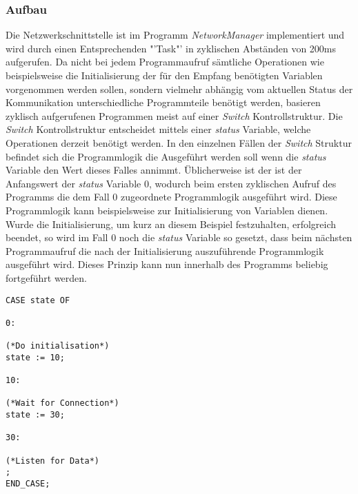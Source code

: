 \subsubsection{Aufbau}
Die Netzwerkschnittstelle ist im Programm \textit{NetworkManager} implementiert und wird durch einen Entsprechenden "'Task"' in zyklischen Abständen von 200ms aufgerufen. Da nicht bei jedem Programmaufruf sämtliche Operationen wie beispielsweise die Initialisierung der für den Empfang benötigten Variablen vorgenommen werden sollen, sondern vielmehr abhängig vom aktuellen Status der Kommunikation unterschiedliche Programmteile benötigt werden, basieren zyklisch aufgerufenen Programmen meist auf einer \textit{Switch} Kontrollstruktur. Die \textit{Switch} Kontrollstruktur entscheidet mittels einer \textit{status} Variable, welche Operationen derzeit benötigt werden. In den einzelnen Fällen der \textit{Switch} Struktur befindet sich die Programmlogik die Ausgeführt werden soll wenn die \textit{status} Variable den Wert dieses Falles annimmt. Üblicherweise ist der ist der Anfangswert der \textit{status} Variable 0, wodurch beim ersten zyklischen Aufruf des Programms die dem Fall 0 zugeordnete Programmlogik ausgeführt wird. Diese Programmlogik kann beispielsweise zur Initialisierung von Variablen dienen. Wurde die Initialisierung, um kurz an diesem Beispiel festzuhalten, erfolgreich beendet, so wird im Fall 0 noch die \textit{status} Variable so gesetzt, dass beim nächsten Programmaufruf die nach der Initialisierung auszuführende Programmlogik ausgeführt wird. Dieses Prinzip kann nun innerhalb des Programms beliebig fortgeführt werden.
\begin{lstlisting}[language = codesysls, captionpos=b, caption={Kontrollstruktur anhand eines Beispiels}]
CASE state OF

0:

(*Do initialisation*)
state := 10;

10:

(*Wait for Connection*)
state := 30;

30:

(*Listen for Data*)
;
END_CASE;
\end{lstlisting}

